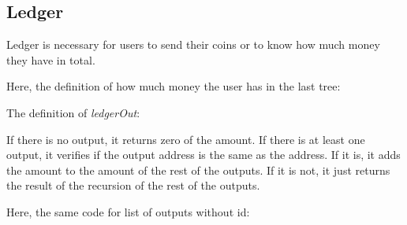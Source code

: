 \subsection{Ledger}

Ledger is necessary for users to send their coins or  to know how much money they have in total.

Here, the definition of how much money the user has in the last tree:


The definition of \emph{ledgerOut}:


If there is no output, it returns zero of the amount.
If there is at least one output, it verifies if the output address is the same as the address.
If it is, it adds the amount to the amount of the rest of the outputs.
If it is not, it just returns the result of the recursion of the rest of the outputs.

Here, the same code for list of outputs without id:

